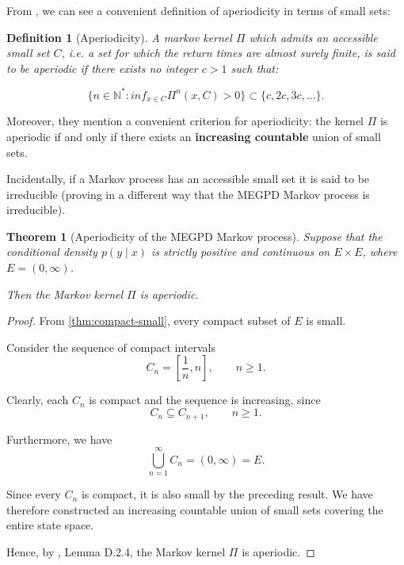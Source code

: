 \documentclass{article}
\newtheorem{definition}{Definition}[section]
\newtheorem{theorem}[theorem]{Theorem}
\begin{document}
From \textcite[Definition D.2.3]{kulik2020}, we can see a convenient definition of aperiodicity in terms of small sets:

\begin{definition}[Aperiodicity]
  A markov kernel $\Pi$ which admits an accessible small set $C$, i.e. a set for which the return times are almost surely finite, is said to be aperiodic if there exists no integer $c > 1$ such that:

  \begin{equation*}
    \{n \in \mathbb{N}^* : inf_{x \in C} \Pi^n (x, C) > 0\} \subset \{c, 2c, 3c, \dots\} .
  \end{equation*}
\end{definition}

Moreover, they mention a convenient criterion for aperiodicity: the kernel $\Pi$ is aperiodic if and only if there exists an \textbf{increasing countable} union of small sets. \parencite[Lemma D.2.4]{kulik2020}

Incidentally, if a Markov process has an accessible small set it is said to be irreducible (proving in a different way that the MEGPD Markov process is irreducible).

\begin{theorem}[Aperiodicity of the MEGPD Markov process]
  Suppose that the conditional density $p(y\mid x)$ is strictly positive and continuous on $E\times E$, where $E=(0,\infty)$.

  Then the Markov kernel $\Pi$ is aperiodic.
\end{theorem}

\begin{proof}
  From \cref{thm:compact-small}, every compact subset of $E$ is small.

  Consider the sequence of compact intervals
  \[
    C_n=\left[\frac{1}{n},n\right],
    \qquad n\geq 1.
  \]

  Clearly, each $C_n$ is compact and the sequence is increasing, since
  \[
    C_n\subseteq C_{n+1},
    \qquad n\geq 1.
  \]

  Furthermore, we have
  \[
    \bigcup_{n=1}^{\infty}C_n
    =(0,\infty)=E.
  \]

  Since every $C_n$ is compact, it is also small by the preceding result. We have therefore constructed an increasing countable union of small sets covering the entire state space.

  Hence, by \textcite{kulik2020}, Lemma D.2.4, the Markov kernel $\Pi$ is aperiodic.
\end{proof}
\end{document}
